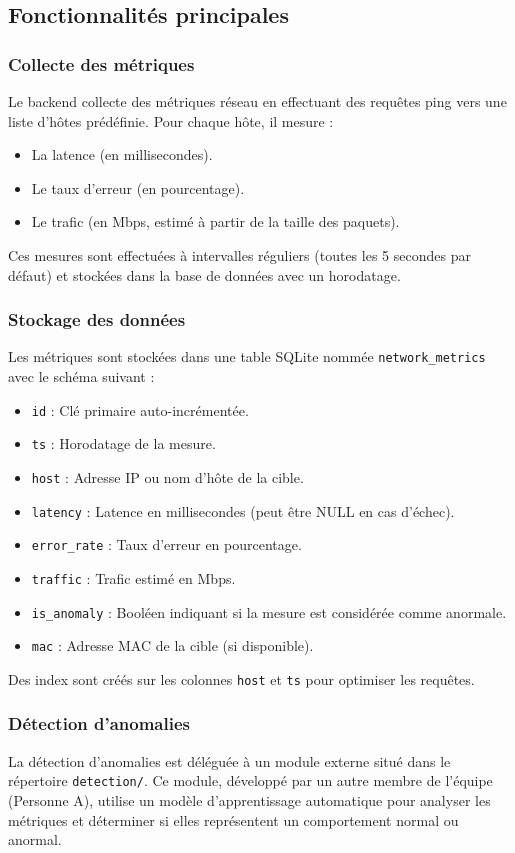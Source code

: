 \documentclass[12pt,a4paper]{report}
\begin{document}
\subsection{Fonctionnalités principales}
\subsubsection{Collecte des métriques}
Le backend collecte des métriques réseau en effectuant des requêtes ping vers une liste d'hôtes prédéfinie. Pour chaque hôte, il mesure :
\begin{itemize}
    \item La latence (en millisecondes).
    \item Le taux d'erreur (en pourcentage).
    \item Le trafic (en Mbps, estimé à partir de la taille des paquets).
\end{itemize}
Ces mesures sont effectuées à intervalles réguliers (toutes les 5 secondes par défaut) et stockées dans la base de données avec un horodatage.

\subsubsection{Stockage des données}
Les métriques sont stockées dans une table SQLite nommée \texttt{network\_metrics} avec le schéma suivant :
\begin{itemize}
    \item \texttt{id} : Clé primaire auto-incrémentée.
    \item \texttt{ts} : Horodatage de la mesure.
    \item \texttt{host} : Adresse IP ou nom d'hôte de la cible.
    \item \texttt{latency} : Latence en millisecondes (peut être NULL en cas d'échec).
    \item \texttt{error\_rate} : Taux d'erreur en pourcentage.
    \item \texttt{traffic} : Trafic estimé en Mbps.
    \item \texttt{is\_anomaly} : Booléen indiquant si la mesure est considérée comme anormale.
    \item \texttt{mac} : Adresse MAC de la cible (si disponible).
\end{itemize}

Des index sont créés sur les colonnes \texttt{host} et \texttt{ts} pour optimiser les requêtes.

\subsubsection{Détection d'anomalies}
La détection d'anomalies est déléguée à un module externe situé dans le répertoire \texttt{detection/}. Ce module, développé par un autre membre de l'équipe (Personne A), utilise un modèle d'apprentissage automatique pour analyser les métriques et déterminer si elles représentent un comportement normal ou anormal.
\end{document}
